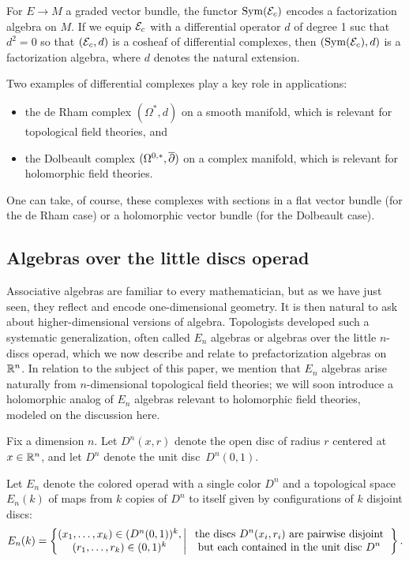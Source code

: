 \documentclass[11pt]{amsart}
\def\owen#1{{\textcolor{violet!65!black}{OG: {#1}}}}
\begin{document}
\begin{thm}[\owen{cite book}]
For $E \to M$ a graded vector bundle, the functor $\operatorname{Sym}(\mathcal E_c)$ encodes a factorization algebra on $M$.
If we equip $\mathcal E_c$ with a differential operator $d$ of degree 1 suc that $d^2 = 0$ so that $(\mathcal E_c, d)$ is a cosheaf of differential complexes,
then $(\operatorname{Sym}(\mathcal E_c), d)$ is a factorization algebra, where $d$ denotes the natural extension.
\end{thm}

Two examples of differential complexes play a key role in applications: 
\begin{itemize}
\item the de Rham complex $(\Omega^*, d)$ on a smooth manifold, which is relevant for topological field theories, and 
\item the Dolbeault complex $(\Omega^{0,*}, {\overline{\partial}})$ on a complex manifold, which is relevant for holomorphic field theories.
\end{itemize}
One can take, of course, these complexes with sections in a flat vector bundle (for the de Rham case) or a holomorphic vector bundle (for the Dolbeault case).

\subsection{Algebras over the little discs operad}

Associative algebras are familiar to every mathematician, but as we have just seen, they reflect and encode one-dimensional geometry.
It is then natural to ask about higher-dimensional versions of algebra.
Topologists developed such a systematic generalization, often called $E_n$ algebras or algebras over the little $n$-discs operad,
which we now describe and relate to prefactorization algebras on~$\mathbb R^n$.
In relation to the subject of this paper, we mention that $E_n$ algebras arise naturally from $n$-dimensional topological field theories;
we will soon introduce a holomorphic analog of $E_n$ algebras relevant to holomorphic field theories,
modeled on the discussion here.

Fix a dimension $n$. 
Let $D^n(x,r)$ denote the open disc of radius $r$ centered at $x \in \mathbb R^n$,
and let $D^n$ denote the unit disc~$D^n(0,1)$.

\begin{dfn}
Let $E_n$ denote the colored operad with a single color $D^n$ and a topological space $E_n(k)$ of maps from $k$ copies of $D^n$ to itself given by configurations of $k$ disjoint discs:
\[
E_n(k) = \left\{ \begin{matrix}(x_1, \ldots, x_k) \in (D^n(0,1))^k,\\ (r_1, \ldots, r_k) \in (0,1)^k\end{matrix} \,\bigg|\, \text{\begin{tabular}{c}the discs $D^n(x_i,r_i)$ are pairwise disjoint\\ but each contained in the unit disc $D^n$\end{tabular}}\right\}.
\]
\end{dfn}
\end{document}
